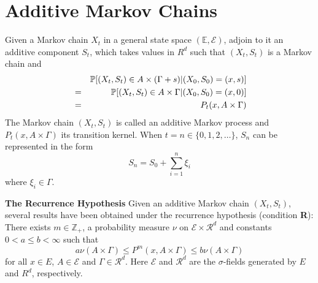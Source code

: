 \documentclass[12pt]{article}
\begin{document}
\section{Additive Markov Chains}
Given a Markov chain $X_t$ in a general state space $(\mathds E,
\mathscr E)$, adjoin to it an additive component $S_t$,
which takes values in $R^d$ such that $(X_t, S_t) $ is a Markov chain
and
\begin{eqnarray*}
&& \P[(X_t, S_t) \in A \times (\Gamma + s) | (X_0, S_0) = (x, s)] \\
&=& \P[(X_t, S_t) \in A \times \Gamma | (X_0, S_0) = (x, 0)] \\
&=& P_t(x, A \times \Gamma)
\end{eqnarray*}
The Markov chain $(X_t, S_t)$ is called an additive Markov process and
$P_t(x, A \times \Gamma)$ its transition kernel.
When $t = n \in \{0, 1, 2, \dots\}$, $S_n$ can be represented in the
form
\[
S_n = S_0 + \sum_{i=1}^n \xi_i
\]
where $\xi_i \in \Gamma$.

{\bf The Recurrence Hypothesis}
Given an additive Markov chain $(X_t, S_t)$, several results have been
obtained under the recurrence hypothesis (condition {\bf R}): There
exists $m \in \mathds Z_+$, a probability measure $\nu$ on $\mathscr E
\times \mathscr R^d$ and constants $0 < a \leq b < \infty$ such that
\[
a \nu(A \times \Gamma) \leq P^m(x, A \times \Gamma) \leq b \nu(A
\times \Gamma)
\]
for all $x \in E$, $A \in \mathscr E$ and $\Gamma \in \mathscr
R^d$. Here $\mathscr E$ and $\mathscr R^d$ are the $\sigma$-fields
generated by $E$ and $R^d$, respectively.
\end{document}
